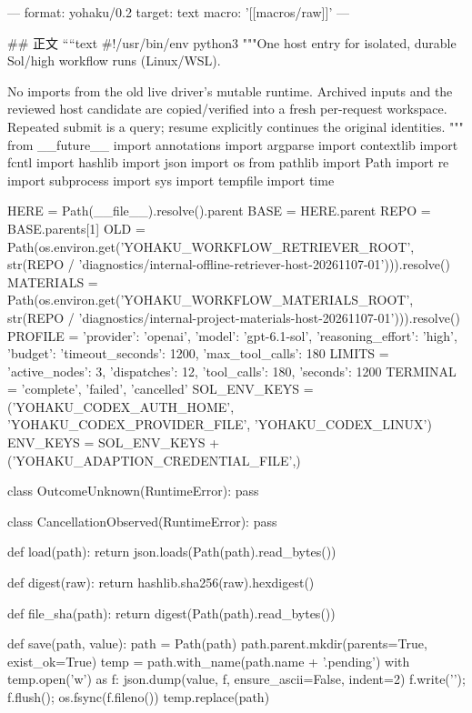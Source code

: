 ---
format: yohaku/0.2
target: text
macro: '[[macros/raw]]'
---

## 正文
````text
#!/usr/bin/env python3
"""One host entry for isolated, durable Sol/high workflow runs (Linux/WSL).

No imports from the old live driver's mutable runtime. Archived inputs and the
reviewed host candidate are copied/verified into a fresh per-request workspace.
Repeated submit is a query; resume explicitly continues the original identities.
"""
from __future__ import annotations
import argparse
import contextlib
import fcntl
import hashlib
import json
import os
from pathlib import Path
import re
import subprocess
import sys
import tempfile
import time

HERE = Path(__file__).resolve().parent
BASE = HERE.parent
REPO = BASE.parents[1]
OLD = Path(os.environ.get('YOHAKU_WORKFLOW_RETRIEVER_ROOT', str(REPO / 'diagnostics/internal-offline-retriever-host-20261107-01'))).resolve()
MATERIALS = Path(os.environ.get('YOHAKU_WORKFLOW_MATERIALS_ROOT', str(REPO / 'diagnostics/internal-project-materials-host-20261107-01'))).resolve()
PROFILE = {'provider': 'openai', 'model': 'gpt-6.1-sol', 'reasoning_effort': 'high',
           'budget': {'timeout_seconds': 1200, 'max_tool_calls': 180}}
LIMITS = {'active_nodes': 3, 'dispatches': 12, 'tool_calls': 180, 'seconds': 1200}
TERMINAL = {'complete', 'failed', 'cancelled'}
SOL_ENV_KEYS = ('YOHAKU_CODEX_AUTH_HOME', 'YOHAKU_CODEX_PROVIDER_FILE', 'YOHAKU_CODEX_LINUX')
ENV_KEYS = SOL_ENV_KEYS + ('YOHAKU_ADAPTION_CREDENTIAL_FILE',)


class OutcomeUnknown(RuntimeError):
    pass


class CancellationObserved(RuntimeError):
    pass


def load(path):
    return json.loads(Path(path).read_bytes())


def digest(raw):
    return hashlib.sha256(raw).hexdigest()


def file_sha(path):
    return digest(Path(path).read_bytes())


def save(path, value):
    path = Path(path)
    path.parent.mkdir(parents=True, exist_ok=True)
    temp = path.with_name(path.name + '.pending')
    with temp.open('w') as f:
        json.dump(value, f, ensure_ascii=False, indent=2)
        f.write('\n'); f.flush(); os.fsync(f.fileno())
    temp.replace(path)


